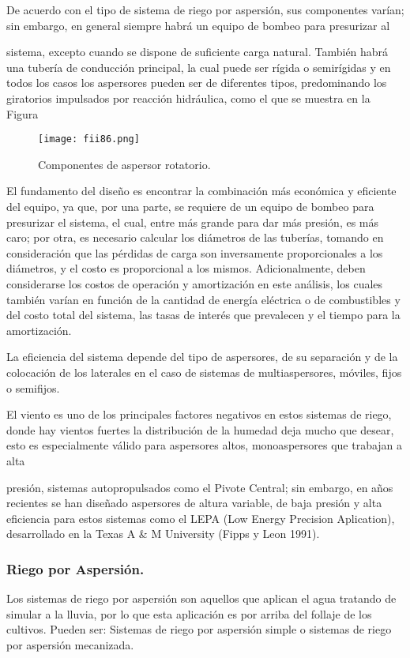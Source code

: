De acuerdo con el tipo de sistema de riego por aspersión, sus componentes
varían; sin embargo, en general siempre habrá un equipo de bombeo para presurizar al

sistema, excepto cuando se dispone de suficiente carga natural. También habrá una
tubería de conducción principal, la cual puede ser rígida o semirígidas y en todos los
casos los aspersores pueden ser de diferentes tipos, predominando los giratorios
impulsados por reacción hidráulica, como el que se muestra en la Figura

\begin{figure}[h!]
	\centerline{\texttt{[image: fii86.png]}}
	\caption{Componentes de aspersor rotatorio.}
	\label{fii86}
\end{figure}

El fundamento del diseño es encontrar la combinación más económica y eficiente
del equipo, ya que, por una parte, se requiere de un equipo de bombeo para presurizar
el sistema, el cual, entre más grande para dar más presión, es más caro; por otra, es
necesario calcular los diámetros de las tuberías, tomando en consideración que las
pérdidas de carga son inversamente proporcionales a los diámetros, y el costo es
proporcional a los mismos. Adicionalmente, deben considerarse los costos de operación
y amortización en este análisis, los cuales también varían en función de la cantidad de
energía eléctrica o de combustibles y del costo total del sistema, las tasas de interés
que prevalecen y el tiempo para la amortización.

La eficiencia del sistema depende del tipo de aspersores, de su separación y de
la colocación de los laterales en el caso de sistemas de multiaspersores, móviles, fijos o
semifijos.

El viento es uno de los principales factores negativos en estos sistemas de riego,
donde hay vientos fuertes la distribución de la humedad deja mucho que desear, esto
es especialmente válido para aspersores altos, monoaspersores que trabajan a alta

presión, sistemas autopropulsados como el Pivote Central; sin embargo, en años
recientes se han diseñado aspersores de altura variable, de baja presión y alta
eficiencia para estos sistemas como el LEPA (Low Energy Precision Aplication),
desarrollado en la Texas A \& M University (Fipps y Leon 1991).

\subsubsection{Riego por Aspersión.}
Los sistemas de riego por aspersión son aquellos que aplican el agua tratando
de simular a la lluvia, por lo que esta aplicación es por arriba del follaje de los cultivos.
Pueden ser: Sistemas de riego por aspersión simple o sistemas de riego por aspersión
mecanizada.

